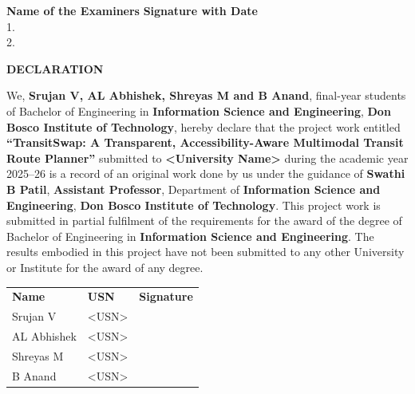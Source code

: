 \documentclass[12pt,a4paper]{report}
\begin{document}
\vspace{30pt}
\noindent
\textbf{Name of the Examiners} \hfill \textbf{Signature with Date}\\[10pt]
1. \underline{\hspace{12cm}}\\[8pt]
2. \underline{\hspace{12cm}}

\clearpage

\thispagestyle{empty}
\begin{center}
{\Large \textbf{DECLARATION}}
\end{center}
\vspace{10pt}
\noindent
We, \textbf{Srujan V, AL Abhishek, Shreyas M and B Anand}, final-year students of Bachelor of Engineering
in \textbf{Information Science and Engineering}, \textbf{Don Bosco Institute of Technology}, hereby declare that the project work
entitled \textbf{``TransitSwap: A Transparent, Accessibility-Aware Multimodal Transit Route
Planner''} submitted to \textbf{<University Name>} during the academic year 2025--26 is a record
of an original work done by us under the guidance of \textbf{Swathi B Patil}, \textbf{Assistant Professor},
Department of \textbf{Information Science and Engineering}, \textbf{Don Bosco Institute of Technology}. This project work is submitted in
partial fulfilment of the requirements for the award of the degree of Bachelor of Engineering in
\textbf{Information Science and Engineering}. The results embodied in this project have not been submitted to any other
University or Institute for the award of any degree.

\vspace{30pt}
\noindent
\begin{tabular}{@{}lll@{}}
\textbf{Name} & \textbf{USN} & \textbf{Signature} \\[8pt]
Srujan V & <USN> & \underline{\hspace{4cm}} \\[6pt]
AL Abhishek & <USN> & \underline{\hspace{4cm}} \\[6pt]
Shreyas M & <USN> & \underline{\hspace{4cm}} \\[6pt]
B Anand & <USN> & \underline{\hspace{4cm}} \\
\end{tabular}
\end{document}

